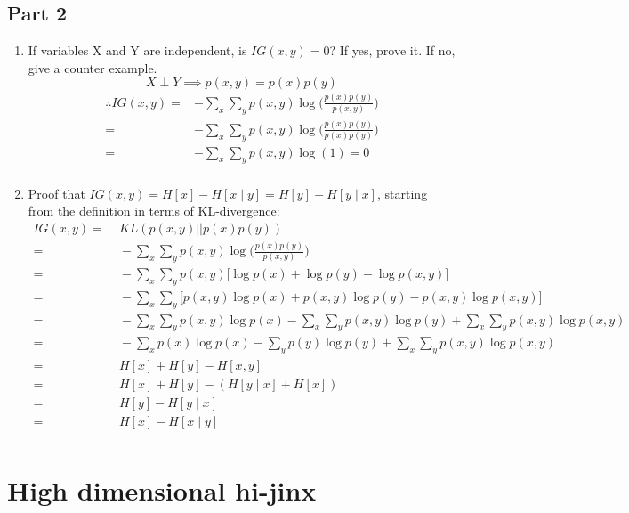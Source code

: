 \documentclass[english]{article}
\begin{document}
\subsection{Part 2}
\begin{enumerate}
	\item If variables X and Y are independent, is $IG(x,y) = 0$? If yes, prove it. If no, give a counter example.
	$$X\perp Y \implies p(x,y) = p(x)p(y)$$
	\begin{align*}
	\therefore IG(x,y) =& -\sum_{x} \sum_{y} p(x,y) \log{\bigg(\frac{p(x)p(y)}{p(x,y)}\bigg)} \\
	=& -\sum_{x} \sum_{y} p(x,y) \log{\bigg(\frac{p(x)p(y)}{p(x)p(y)}\bigg)} \\
	=& -\sum_{x} \sum_{y} p(x,y) \log{(1)} = 0 \\
	\end{align*}
	\pagebreak
	\item Proof that $IG(x,y) = H[x] - H[x \mid y] = H[y] - H[y \mid x]$,
	starting from the definition in terms of KL-divergence:
	\begin{align*}
	IG(x,y) =&\; KL\left(p(x,y)||p(x)p(y)\right) \\
	=&\;  -\sum_{x} \sum_{y} p(x,y) \log{\bigg(\frac{p(x)p(y)}{p(x,y)}\bigg)} \\
	=&\; -\sum_{x} \sum_{y} p(x,y) \big[\log{p(x)} + \log{p(y)} - \log{p(x,y)}\big] \\
	=&\; -\sum_{x} \sum_{y} \big[p(x,y)\log{p(x)} + p(x,y)\log{p(y)} - p(x,y)\log{p(x,y)}\big] \\
	=&\; -\sum_{x} \sum_{y} p(x,y)\log{p(x)} -\sum_{x} \sum_{y} p(x,y)\log{p(y)} + \sum_{x} \sum_{y} p(x,y)\log{p(x,y)} \\
	=&\; -\sum_{x}  p(x)\log{p(x)} - \sum_{y} p(y)\log{p(y)} + \sum_{x} \sum_{y} p(x,y)\log{p(x,y)} \\
	=&\; H[x] + H[y] - H[x,y] \\
	=&\; H[x] + H[y] - (H[y \mid x] + H[x]) \\
	=&\; H[y] - H[y \mid x] \\
	=&\; H[x] - H[x \mid y] \\
	\end{align*}
\end{enumerate}

\section{High dimensional hi-jinx}
\end{document}
